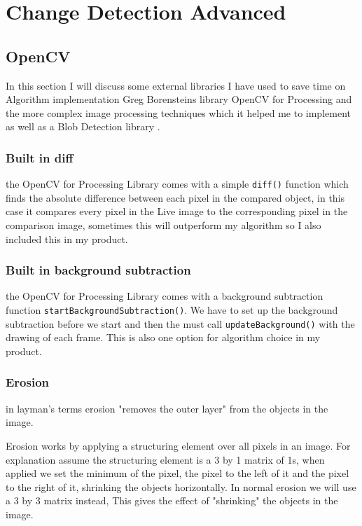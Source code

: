 \documentclass[a4paper]{report}
\begin{document}
\section{Change Detection Advanced}
\subsection{OpenCV}
In this section I will discuss some external libraries I have used to save time on Algorithm implementation Greg Borensteins library OpenCV for Processing \cite{OPENCV} and the more complex image processing techniques which it helped me to implement as well as a Blob Detection library \cite{BLOB}.

\subsubsection{Built in diff}
the OpenCV for Processing Library comes with a simple \verb|diff()| function which finds the absolute difference between each pixel in the compared object, in this case it compares every pixel in the Live image to the corresponding pixel in the comparison image, sometimes this will outperform my algorithm so I also included this in my product.

\subsubsection{Built in background subtraction}
the OpenCV for Processing Library comes with a background subtraction function \verb|startBackgroundSubtraction()|. We have to set up the background subtraction before we start and then the must call \verb|updateBackground()| with the drawing of each frame. This is also one option for algorithm choice in my product.

\subsubsection{Erosion}
in layman's terms erosion "removes the outer layer" from the objects in the image.

Erosion works by applying a structuring element over all pixels in an image. For explanation assume the structuring element is a 3 by 1 matrix of 1s, when applied we set the minimum of the pixel, the pixel to the left of it and the pixel to the right of it, shrinking the objects horizontally. In normal erosion we will use a 3 by 3 matrix instead, This gives the effect of "shrinking" the objects in the image.
\end{document}
